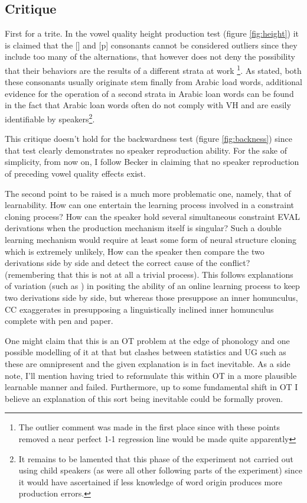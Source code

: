 \documentclass[a4paper,12pt]{article}
\begin{document}
\subsection{Critique}
First for a trite. In the vowel quality height production test (figure \ref{fig:height}) it is
claimed that the [] and [p] consonants cannot be considered outliers since they include
too many of the alternations, that however does not deny the possibility that their behaviors are
the results of a different strata at work \footnote{The outlier comment was made in the first place
since with these points removed a near perfect 1-1 regression line would be made quite apparently}.
As stated, both these consonants usually originate stem finally from Arabic load words,
additional evidence for the operation of a second strata in Arabic loan words can be found in
the fact that Arabic loan words often do not comply with VH and are easily identifiable by
speakers\footnote{It remains to be lamented that this phase of the experiment not carried out using
 child speakers (as were all other following parts of the experiment) since it would have
ascertained if less knowledge of word origin produces more production errors.}.

This critique doesn't hold for the backwardness test (figure \ref{fig:backness}) since that test
clearly demonstrates no speaker reproduction ability. For the sake of simplicity, from now on, I
follow Becker in claiming that no speaker reproduction of preceding vowel quality effects exist.

The second point to be raised is a much more problematic one, namely, that of learnability. How can
one entertain the learning process involved in a constraint cloning process? How can the speaker
hold several simultaneous constraint EVAL derivations when the production mechanism itself is
singular? Such a double learning mechanism would require at least some form of neural structure
cloning which is extremely unlikely, How can the speaker then compare the two derivations side by
side and detect the correct cause of the conflict? (remembering that this is not at all a trivial
process). This follows explanations of variation (such as \cite{coetzee_phonological_2008}) in
positing the ability of an online learning process to keep two derivations side by side, but
whereas those presuppose an inner homunculus, CC exaggerates in presupposing a linguistically
inclined inner homunculus complete with pen and paper.

One might claim that this is an OT problem at the edge of phonology and one possible modelling of
it at that but clashes between statistics and UG such as these are omnipresent and the given
explanation is in fact inevitable. As a side note, I'll mention having tried to reformulate this
within OT in a more plausible learnable manner and failed. Furthermore, up to some fundamental
shift in OT I believe an explanation of this sort being inevitable could be formally proven.
\end{document}
